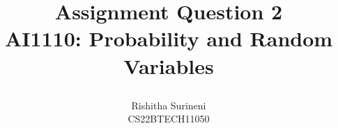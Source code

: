 \documentclass[journal,12pt,twocolumn]{IEEEtran}
\begin{document}
\let\vec\mathbf

\vspace{3cm}

\title{
\textbf{Assignment Question 2} \\ \large \textbf{AI1110}: Probability and Random Variables 


}
\author{ Rishitha Surineni\\ CS22BTECH11050} 

\maketitle

\newpage


\bigskip

\renewcommand{\thefigure}{\theenumi}
\renewcommand{\thetable}{\theenumi}
\end{document}
